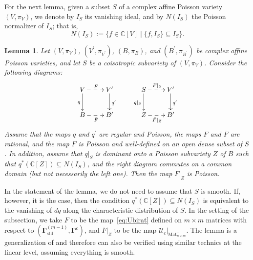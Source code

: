 \documentclass[11pt]{article}
\newcommand{\bg}{\mathbf{\Gamma}}
\newcommand{\std}{\mathrm{std}}
\DeclareMathOperator{\Mat}{Mat}
\newtheorem{lemma}[theorem]{Lemma}%
\theoremstyle{definition}\newtheorem{definition}[theorem]{Definition}
\theoremstyle{definition}\newtheorem{remark}[theorem]{Remark}
\theoremstyle{remark}
\numberwithin{equation}{section}
\begin{document}
For the next lemma, given a subset $S$ of a complex affine Poisson variety $(V,\pi_V)$, we denote by $I_S$ its vanishing ideal, and by $N(I_S)$ the Poisson normalizer of $I_S$; that is,
\begin{equation*}
    N(I_S):=\{f \in \mathbb{C}[V] \mid \{f,I_{S}\}\subseteq I_{S}\}.
\end{equation*}

\begin{lemma}\label{l:coisop_slice}
    Let $(V,\pi_V)$, $(V^\prime,\pi_{V^\prime})$, $(B,\pi_B)$, and $(B^\prime,\pi_{B^\prime})$ be complex affine Poisson varieties, and let $S$ be a coisotropic subvariety of $(V,\pi_V)$. Consider the following diagrams:
    \begin{equation}\label{eq:coisop_slice}
    \xymatrix{
        V \ar@{-->}[r]^{F} \ar[d]_{q} & V^\prime \ar[d]^{q^\prime} \\
        B \ar@{-->}[r]_{\bar{F}} & B^\prime
        } \quad \quad \xymatrix{
        S \ar@{-->}[r]^{F|_S} \ar[d]_{q|_S} & V^\prime \ar[d]^{q^\prime} \\
        Z \ar@{-->}[r]_{\bar{F}|_Z} & B^\prime
        }
    \end{equation}
    Assume that the maps $q$ and $q^\prime$ are regular and Poisson, the maps $F$ and $\bar{F}$ are rational, and the map $F$ is Poisson and well-defined on an open dense subset of $S$. In addition, assume that $q|_S$ is dominant onto a Poisson subvariety $Z$ of $B$ such that $q^*(\mathbb{C}[Z])\subseteq N(I_S)$, and the right diagram commutes on a common domain (but not necessarily the left one). Then the map $\bar{F}|_{Z}$  is Poisson.
\end{lemma}
In the statement of the lemma, we do not need to assume that $S$ is smooth. If, however, it is the case, then the condition $q^*(\mathbb{C}[Z]) \subseteq N(I_S)$ is equivalent to the vanishing of $dq$ along the characteristic distribution of $S$. In the setting of the subsection, we  take $F$ to be the map~\eqref{eq:Ubirat} defined on $m \times m$ matrices with respect to $(\bg_{\std}^{(m-1)},\bg^c)$, and $\bar{F}|_Z$ to be the map $\mathcal{U}_c|_{\Mat^-_{n \times m}}$. The lemma is a generalization of \cite[Proposition 6.7, Part 1]{lu-evens} and therefore can also be verified using similar technics at the linear level, assuming everything is smooth.
\end{document}

